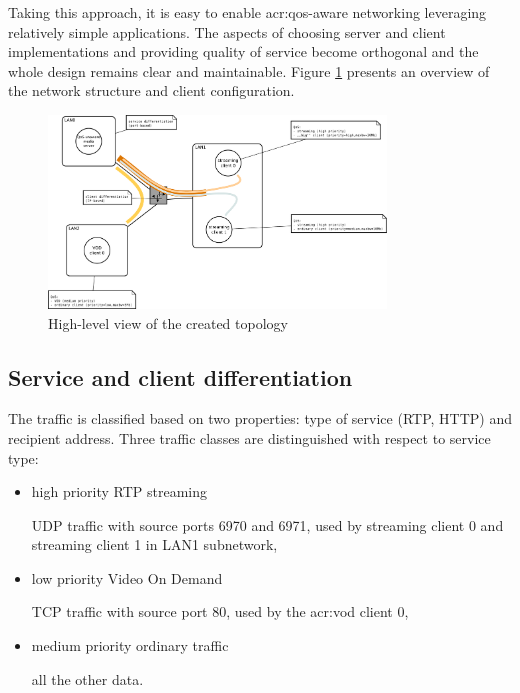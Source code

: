 \documentclass[11pt]{book}
\begin{document}
        Taking this approach, it is easy to enable \gls{acr:qos}-aware networking leveraging relatively simple applications. The
        aspects of choosing server and client implementations and providing quality of service become orthogonal and the
        whole design remains clear and maintainable. Figure \ref{fig:cs:scenario} presents an overview of the network
        structure and client configuration.
      
        \begin{figure}[H]
          \begin{center}
            \includegraphics[width=0.8\textwidth]{img/test-case/diagram.pdf}
          \end{center}

          \caption{High-level view of the created topology}
          \label{fig:cs:scenario}
        \end{figure}
      

      \subsection{Service and client differentiation}
      \label{sub:uc:diff}

        The traffic is classified based on two properties: type of service (RTP, HTTP) and recipient address. Three
        traffic classes are distinguished with respect to service type:

        \begin{itemize}

          \item high priority RTP streaming

                UDP traffic with source ports 6970 and 6971, used by streaming client 0
                and streaming client 1 in LAN1 subnetwork,

          \item low priority Video On Demand
          
                TCP traffic with source port 80, used by the \gls{acr:vod} client 0,

          \item medium priority ordinary traffic
          
                all the other data.

        \end{itemize}
\end{document}
